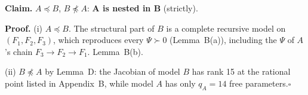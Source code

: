 \documentclass[10pt,a4paper]{article}
\newcommand{\nest}{\preceq}
\newcommand{\nnest}{\not\preceq}
\begin{document}
\par\bigskip
\noindent\textbf{Claim.} $A \nest B$, $B \nnest A$: \textbf{A is nested in B} (strictly).\par\smallskip
\noindent\textbf{Proof.} (i) $A\nest B$. The structural part of $B$ is a complete recursive model on $(F_1,F_2,F_3)$, which reproduces every $\Psi\succ0$ (Lemma~B(a)), including the $\Psi$ of $A$'s chain $F_3\to F_2\to F_1$. Lemma~B(b).\par\smallskip
\noindent(ii) $B\nnest A$ by Lemma~D: the Jacobian of model $B$ has rank 15 at the rational point listed in Appendix~B, while model $A$ has only $q_A=14$ free parameters.\hfill$\square$\par\medskip
{}

\clearpage
\end{document}

